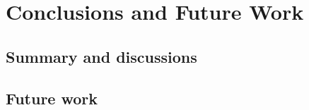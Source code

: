 \chapter{Conclusions and Future Work}
\label{ch:conclusion}

\section{Summary and discussions}

\section{Future work}

